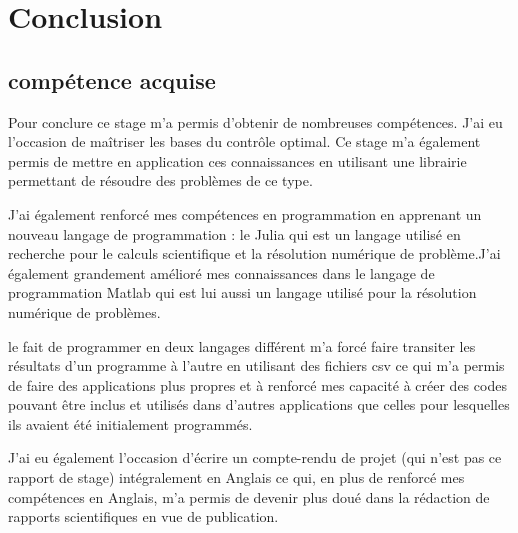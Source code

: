 \documentclass{article} %
\begin{document}
		\newpage
		\section{Conclusion}
		\subsection{compétence acquise}
		Pour conclure ce stage m'a permis d'obtenir de nombreuses compétences.
		 J'ai eu l'occasion de maîtriser les bases du contrôle optimal. Ce stage m'a également permis de mettre en application ces connaissances en utilisant une librairie permettant de résoudre des problèmes de ce type.
		
		J'ai également renforcé mes compétences en programmation en apprenant un nouveau langage de programmation : le Julia qui est un langage utilisé en recherche pour le calculs scientifique et la résolution numérique de problème.J'ai également grandement amélioré mes connaissances dans le langage de programmation Matlab qui est lui aussi un langage utilisé pour la résolution numérique de problèmes.
		
		le fait de programmer en deux langages différent m'a forcé faire transiter les résultats d'un programme à l'autre en utilisant des fichiers csv ce qui m'a permis de faire des applications plus propres et à renforcé mes capacité à créer des codes pouvant être inclus et utilisés dans d'autres applications que celles pour lesquelles ils avaient été initialement programmés.
		
		J'ai eu également l'occasion d'écrire un compte-rendu de projet (qui n'est pas ce rapport de stage) intégralement en Anglais ce qui, en plus de renforcé mes compétences en Anglais, m'a permis de devenir plus doué dans la rédaction de rapports scientifiques en vue de publication.
		
		
		
\end{document}
